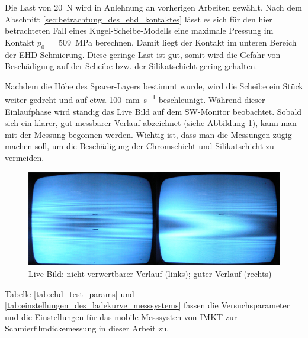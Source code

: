 Die Last von \SI{20}{\newton} wird in Anlehnung an vorherigen Arbeiten gewählt.
Nach dem Abschnitt \ref{sec:betrachtung_des_ehd_kontaktes} lässt es sich für den hier betrachteten Fall eines Kugel-Scheibe-Modells eine maximale Pressung im Kontakt $p_0 =$ \SI{509}{\mega\pascal} berechnen.
Damit liegt der Kontakt im unteren Bereich der EHD-Schmierung.
Diese geringe Last ist gut, somit wird die Gefahr von Beschädigung auf der Scheibe bzw. der Silikatschicht gering gehalten.

Nachdem die Höhe des Spacer-Layers bestimmt wurde, wird die Scheibe ein Stück weiter gedreht und auf etwa \SI[per-mode=symbol]{100}{\mm\per\second} beschleunigt.
Während dieser Einlaufphase wird ständig das Live Bild auf dem SW-Monitor beobachtet.
Sobald sich ein klarer, gut messbarer Verlauf abzeichnet (siehe Abbildung \ref{fig:ehd_live_bild}), kann man mit der Messung begonnen werden.
Wichtig ist, dass man die Messungen zügig machen soll, um die Beschädigung der Chromschicht und Silikatschicht zu vermeiden.
\begin{figure}[htb]
    \centering
    \includegraphics[width=0.8\linewidth]{./images/ehd_live_bild.jpg}
    \caption{Live Bild: nicht verwertbarer Verlauf (links); guter Verlauf (rechts) \cite{mach_2008}}
    \label{fig:ehd_live_bild}
\end{figure}

Tabelle \ref{tab:ehd_test_params} und \ref{tab:einstellungen_des_ladekurve_messsystems} fassen die Versuchsparameter und die Einstellungen für das mobile Messsysten von IMKT zur Schmierfilmdickemessung in dieser Arbeit zu.





